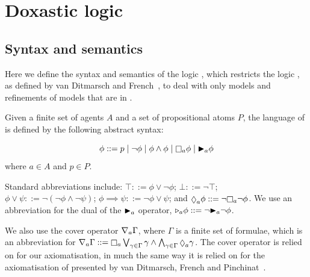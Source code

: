 \chapter{Doxastic logic}

\section{Syntax and semantics}

Here we define the syntax and semantics of the logic \logicKDF{}, which
restricts the logic \logicK{}, as defined by van Ditmarsch and
French~\cite{french2009simulation}, to deal with only models and refinements of
models that are in \classKD{}.


\begin{definition} %
Given a finite set of agents $A$ and a set of propositional atoms $P$, the
language of \langF{} is defined by the following abstract syntax:

$$
\phi ::=    p \bnfalt
            \neg \phi \bnfalt
            \phi \land \phi \bnfalt
            \knows_a \phi \bnfalt
            \allrefs_a \phi
$$
where $a \in A$ and $p \in P$.
\end{definition}

Standard abbreviations include:
$\top ::= \phi \lor \neg \phi$;
$\bot ::= \neg \top$;
$\phi \lor \psi ::= \neg (\neg \phi \land \neg \psi)$;
$\phi \implies \psi ::= \neg \phi \lor \psi$;
and $\suspects_a \phi ::= \neg \knows_a \neg \phi$.
We use an abbreviation for the dual of the ${\mathopen{\blacktriangleright}}_a$ operator,
${\mathopen{\triangleright}}_a \phi ::= \neg {\ensuremath{\mathopen{\blacktriangleright}}}_a \neg \phi$.

We also use the cover operator $\nabla_a \Gamma$, where $\Gamma$ is a finite
set of formulae, which is an abbreviation for 
$\covers_a \Gamma ::= \knows_a \bigvee_{\gamma \in \Gamma} \gamma \land
\bigwedge_{\gamma \in \Gamma} \suspects_a \gamma$. The cover operator is relied
on for our axiomatisation, in much the same way it is relied on for the
axiomatisation of \logicKiF{} presented by van Ditmarsch, French and
Pinchinat~\cite{french2010future}. %

